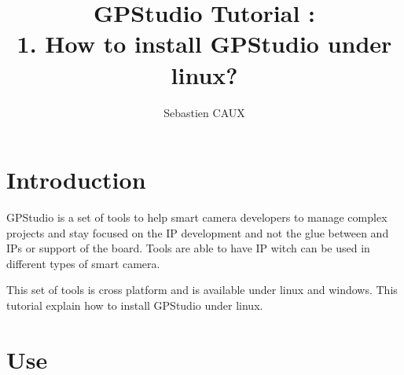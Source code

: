 \documentclass[10pt,a4paper]{article}
\author{Sebastien CAUX}
\title{GPStudio Tutorial : \\ 1. How to install GPStudio under linux?}
\begin{document}
\maketitle
\section{Introduction}
GPStudio is a set of tools to help smart camera developers to manage complex projects and stay focused on the IP development and not the glue between and IPs or support of the board. Tools are able to have IP witch can be used in different types of smart camera.

This set of tools is cross platform and is available under linux and windows. This tutorial explain how to install GPStudio under linux.

\section{Use}
\end{document}
